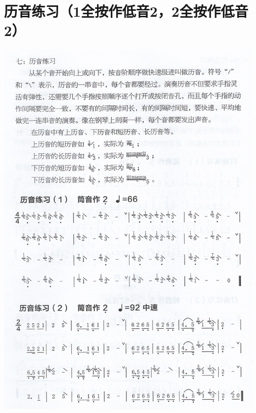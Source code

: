 \documentclass[cn,pad,chinese,chinesefont=nofont]{elegantbook}
\begin{document}
\section{历音练习（1全按作低音2，2全按作低音2）}
\includegraphics[height=\textheight]{dongxiao/Scan 13.jpeg}
\end{document}
